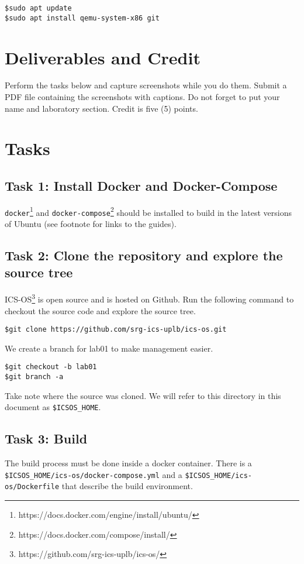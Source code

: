 \documentclass[a4paper, 11pt,oneside]{article}
\begin{document}
\begin{verbatim}
$sudo apt update
$sudo apt install qemu-system-x86 git
\end{verbatim}


\section{Deliverables and Credit}
Perform the tasks below and capture screenshots while you do them. Submit a PDF 
file containing the screenshots with captions. Do not forget to put your name 
and laboratory section. Credit is five (5) points.

\section{Tasks}

\subsection*{Task 1: Install Docker and Docker-Compose}
\texttt{docker}\footnote{https://docs.docker.com/engine/install/ubuntu/} and 
\texttt{docker-compose}\footnote{https://docs.docker.com/compose/install/} 
should be installed to build in the latest versions of Ubuntu (see footnote for 
links to the guides). 


\subsection*{Task 2: Clone the repository and explore the source tree}
ICS-OS\footnote{https://github.com/srg-ics-uplb/ics-os/} is open source and is 
hosted on Github. Run the following command to checkout the source code and 
explore the source tree.

\begin{verbatim}
$git clone https://github.com/srg-ics-uplb/ics-os.git
\end{verbatim}

We create a branch for lab01 to make management easier.
\begin{verbatim}
$git checkout -b lab01
$git branch -a
\end{verbatim}

Take note where the source was cloned. We will refer to this directory in 
this document as \texttt{\$ICSOS\_HOME}.

\subsection*{Task 3: Build}
The build process must be done inside a docker container. There is a 
\texttt{\$ICSOS\_HOME/ics-os/docker-compose.yml} and a 
\texttt{\$ICSOS\_HOME/ics-os/Dockerfile} that describe the build environment.
\end{document}
